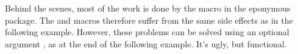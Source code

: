 \documentclass[10pt, a4paper]{tutodoc}
\begin{document}
\begin{tdocwarn}
    Behind the scenes, most of the work is done by the  macro in the eponymous package. 
    The  and  macros therefore suffer from the same side effects as in the following example.
	However, these problems can be solved using an optional argument , as at the end of the following example. It's ugly, but functional.

\end{tdocwarn}
\end{document}
